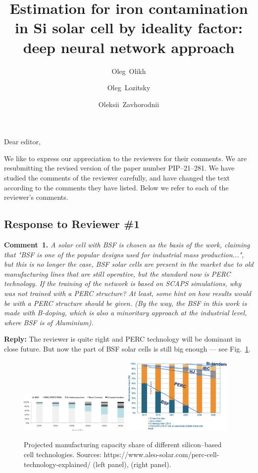 \documentclass[num-refs]{wiley-article} %
\title{Estimation for iron contamination in Si solar cell by ideality factor: deep neural network approach}
\author[1]{Oleg~Olikh}
\author[1]{Oleg~Lozitsky}
\author[1]{Oleksii~Zavhorodnii}
\affil[1]{Taras Shevchenko National University of Kyiv, 64/13, Volodymyrska Street, Kyiv, 01601, Ukraine}
\begin{document}
Dear editor,

We like to express our appreciation to the reviewers for their comments.
We are resubmitting the revised version of the paper number PIP--21--281.
We have studied the comments of the reviewer carefully, and have changed the text according to the comments they
have listed.
Below we refer to each of the reviewer’s comments.

\subsection*{Response to Reviewer \#1 }



\noindent
\textcolor[rgb]{0.00,0.50,1.00}{\textbf{Comment~1.}}
\emph{A solar cell with BSF is chosen as the basis of the work, claiming that
"BSF is one of the popular designs used for industrial mass production...",
but this is no longer the case, BSF solar cells are present in the market due to old manufacturing lines that are still operative, but the standard now is PERC technology.
If the training of the network is based on SCAPS simulations, why was not trained with a PERC structure?
At least, some hint on how results would be with a PERC structure should be given.
(By the way, the BSF in this work is made with B-doping, which is also a minoritary approach at the industrial level, where BSF is of Aluminium).}

\vspace{0.5cm}
\noindent
\textcolor[rgb]{0.51,0.00,0.00}{\textbf{Reply:}}
The reviewer is quite right and PERC technology will be dominant in close future.
But now the part of BSF solar cells is still big enough --- see Fig.~\ref{fig_BSF}.


\begin{figure}[b]
\centering
\includegraphics[width=0.48\textwidth]{BSF_PERC1}
\includegraphics[width=0.48\textwidth]{BSF_PERC2}
\caption{Projected manufacturing capacity share of different
silicon--based cell technologies.
Sources:  https://www.aleo-solar.com/perc-cell-technology-explained/
(left panel), \cite{GreenRew2019} (right panel).
}
\label{fig_BSF}
\end{figure}
\end{document}
